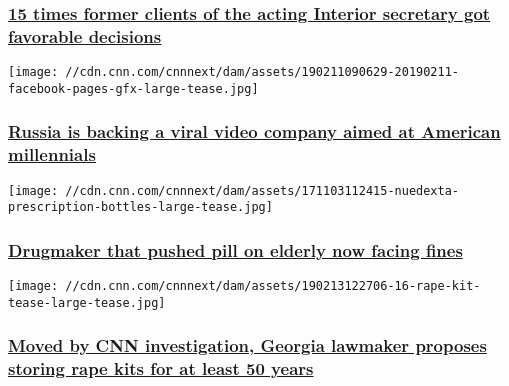\hypertarget{15-times-former-clients-of-the-acting-interior-secretary-got-favorable-decisions}{%
\subsubsection{\texorpdfstring{\href{/2019/03/05/politics/david-bernhardt-interior-oil-and-gas/index.html}{15
times former clients of the acting Interior secretary got favorable
decisions}}{15 times former clients of the acting Interior secretary got favorable decisions}}\label{15-times-former-clients-of-the-acting-interior-secretary-got-favorable-decisions}}

\href{/2019/02/15/tech/russia-facebook-viral-videos/index.html}{}

\texttt{[image: //cdn.cnn.com/cnnnext/dam/assets/190211090629-20190211-facebook-pages-gfx-large-tease.jpg]}

\hypertarget{russia-is-backing-a-viral-video-company-aimed-at-american-millennials}{%
\subsubsection{\texorpdfstring{\href{/2019/02/15/tech/russia-facebook-viral-videos/index.html}{Russia
is backing a viral video company aimed at American
millennials}}{Russia is backing a viral video company aimed at American millennials}}\label{russia-is-backing-a-viral-video-company-aimed-at-american-millennials}}

\href{/2019/02/13/health/nuedexta-doj-investigation-invs/index.html}{}

\texttt{[image: //cdn.cnn.com/cnnnext/dam/assets/171103112415-nuedexta-prescription-bottles-large-tease.jpg]}

\hypertarget{drugmaker-that-pushed-pill-on-elderly-now-facing-fines}{%
\subsubsection{\texorpdfstring{\href{/2019/02/13/health/nuedexta-doj-investigation-invs/index.html}{Drugmaker
that pushed pill on elderly now facing
fines}}{Drugmaker that pushed pill on elderly now facing fines}}\label{drugmaker-that-pushed-pill-on-elderly-now-facing-fines}}

\href{/2019/02/13/health/rape-kit-destruction-investigation-georgia-law/index.html}{}

\texttt{[image: //cdn.cnn.com/cnnnext/dam/assets/190213122706-16-rape-kit-tease-large-tease.jpg]}

\hypertarget{moved-by-cnn-investigation-georgia-lawmaker-proposes-storing-rape-kits-for-at-least-50-years-}{%
\subsubsection{\texorpdfstring{\href{/2019/02/13/health/rape-kit-destruction-investigation-georgia-law/index.html}{Moved
by CNN investigation, Georgia lawmaker proposes storing rape kits for at
least 50 years
}}{Moved by CNN investigation, Georgia lawmaker proposes storing rape kits for at least 50 years }}\label{moved-by-cnn-investigation-georgia-lawmaker-proposes-storing-rape-kits-for-at-least-50-years-}}

